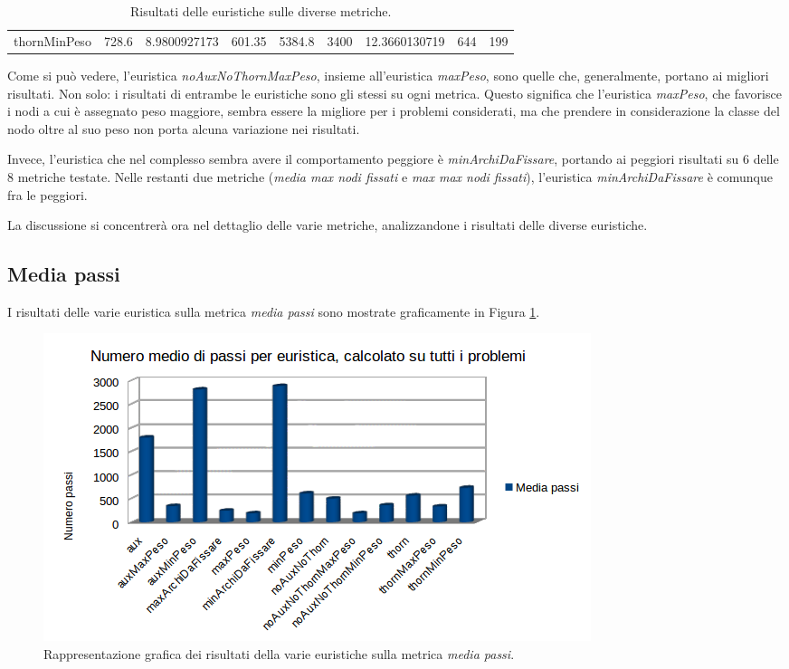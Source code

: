 \begin{table}
\begin{tabular}{l|c|c|c|c|c|c|c|c}
thornMinPeso        & 728.6                & 8.9800927173                                                     & 601.35                                                                      & 5384.8                                                                     & 3400               & 12.3660130719                                                  & 644                                                                     & 199                                                                   
\end{tabular}
\caption{Risultati delle euristiche sulle diverse metriche.}
\label{tab:results}
\end{table}

Come si può vedere, l'euristica \textit{noAuxNoThornMaxPeso}, insieme all'euristica \textit{maxPeso}, sono quelle che, generalmente, portano ai migliori risultati. Non solo: i risultati di entrambe le euristiche sono gli stessi su ogni metrica. Questo significa che l'euristica \textit{maxPeso}, che favorisce i nodi a cui è assegnato peso maggiore, sembra essere la migliore per i problemi considerati, ma che prendere in considerazione la classe del nodo oltre al suo peso non porta alcuna variazione nei risultati.

Invece, l'euristica che nel complesso sembra avere il comportamento peggiore è \textit{minArchiDaFissare}, portando ai peggiori risultati su 6 delle 8 metriche testate. Nelle restanti due metriche (\textit{media max nodi fissati} e \textit{max max nodi fissati}), l'euristica \textit{minArchiDaFissare} è comunque fra le peggiori.

La discussione si concentrerà ora nel dettaglio delle varie metriche, analizzandone i risultati delle diverse euristiche.

\subsection{Media passi}
\label{subsec:mediaPassi}
I risultati delle varie euristica sulla metrica \textit{media passi} sono mostrate graficamente in Figura \ref{fig:mediaPassi}.

\begin{figure}[H]
\includegraphics[width=\textwidth]{res/img/mediaPassi.png}
\caption{Rappresentazione grafica dei risultati della varie euristiche sulla metrica \textit{media passi}.}
\label{fig:mediaPassi}
\end{figure}

